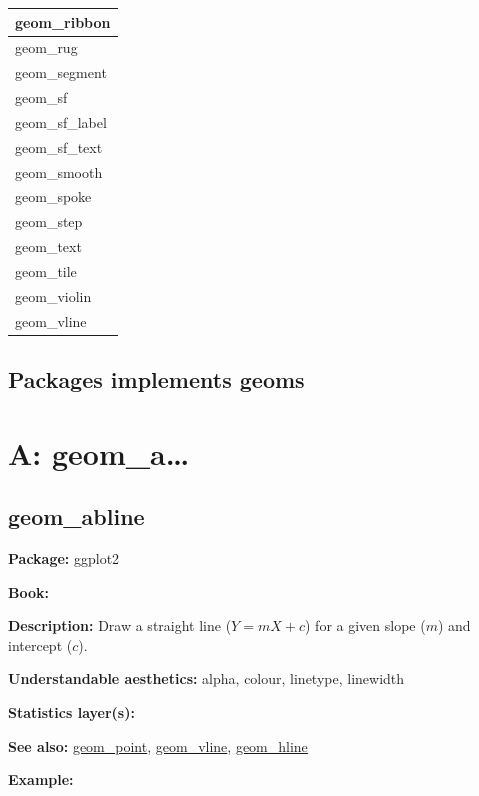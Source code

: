 \documentclass[
]{book}
\begin{document}
\begin{tabular}{l}
\hline
geom\_ribbon\\
\hline
geom\_rug\\
\hline
geom\_segment\\
\hline
geom\_sf\\
\hline
geom\_sf\_label\\
\hline
geom\_sf\_text\\
\hline
geom\_smooth\\
\hline
geom\_spoke\\
\hline
geom\_step\\
\hline
geom\_text\\
\hline
geom\_tile\\
\hline
geom\_violin\\
\hline
geom\_vline\\
\hline
\end{tabular}

\hypertarget{packages-implements-geoms}{%
\section{Packages implements geoms}\label{packages-implements-geoms}}

\hypertarget{a-geom_a}{%
\chapter{A: geom\_a\ldots{}}\label{a-geom_a}}

\hypertarget{abline}{%
\section{geom\_abline}\label{abline}}

\textbf{Package: } ggplot2 \autocite{R-ggplot2}

\textbf{Book: }

\textbf{Description: } Draw a straight line (\(Y=mX+c\)) for a given slope (\(m\)) and intercept (\(c\)).

\textbf{Understandable aesthetics:} alpha, colour, linetype, linewidth

\textbf{Statistics layer(s):}

\textbf{See also: } \protect\hyperlink{point}{geom\_point}, \protect\hyperlink{vline}{geom\_vline}, \protect\hyperlink{hline}{geom\_hline}

\textbf{Example:}
\end{document}

